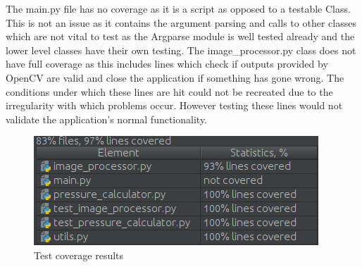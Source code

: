 			The main.py file has no coverage as it is a script as opposed to a testable Class. This is not an issue as it contains the argument parsing and calls to other classes which are not vital to test as the Argparse module is well tested already and the lower level classes have their own testing. The image\_processor.py class does not have full coverage as this includes lines which check if outputs provided by OpenCV are valid and close the application if something has gone wrong. The conditions under which these lines are hit could not be recreated due to the irregularity with which problems occur. However testing these lines would not validate the application’s normal functionality.
			\begin{figure}[h!]
				\centering
				\includegraphics[scale=0.7]{../images/results/coverage.png}
				\caption{Test coverage results}
				\label{fig:coverage}
			\end{figure}
